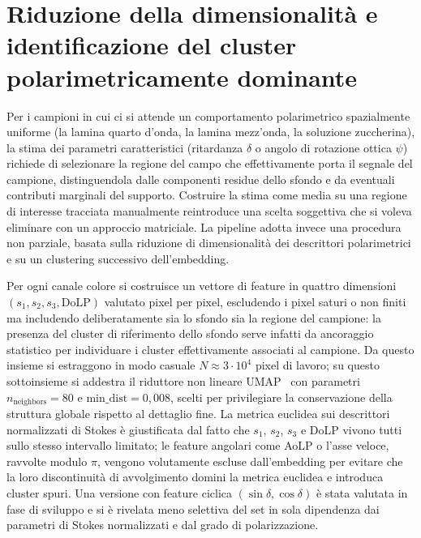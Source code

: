 
\section{Riduzione della dimensionalità e identificazione del cluster polarimetricamente dominante}
\label{sec:umap_clustering}

Per i campioni in cui ci si attende un comportamento polarimetrico spazialmente uniforme (la lamina quarto d'onda, la lamina mezz'onda, la soluzione zuccherina), la stima dei parametri caratteristici (ritardanza $\delta$ o angolo di rotazione ottica $\psi$) richiede di selezionare la regione del campo che effettivamente porta il segnale del campione, distinguendola dalle componenti residue dello sfondo e da eventuali contributi marginali del supporto. Costruire la stima come media su una regione di interesse tracciata manualmente reintroduce una scelta soggettiva che si voleva eliminare con un approccio matriciale. La pipeline adotta invece una procedura non parziale, basata sulla riduzione di dimensionalità dei descrittori polarimetrici e su un clustering successivo dell'embedding.

Per ogni canale colore si costruisce un vettore di feature in quattro dimensioni $(s_1, s_2, s_3, \mathrm{DoLP})$ valutato pixel per pixel, escludendo i pixel saturi o non finiti ma includendo deliberatamente sia lo sfondo sia la regione del campione: la presenza del cluster di riferimento dello sfondo serve infatti da ancoraggio statistico per individuare i cluster effettivamente associati al campione. Da questo insieme si estraggono in modo casuale $N \approx 3 \cdot 10^{4}$ pixel di lavoro; su questo sottoinsieme si addestra il riduttore non lineare UMAP~\cite{McInnes2018umap} con parametri $n_{\mathrm{neighbors}} = 80$ e $\mathrm{min\_dist} = 0{,}008$, scelti per privilegiare la conservazione della struttura globale rispetto al dettaglio fine. La metrica euclidea sui descrittori normalizzati di Stokes è giustificata dal fatto che $s_1$, $s_2$, $s_3$ e DoLP vivono tutti sullo stesso intervallo limitato; le feature angolari come AoLP o l'asse veloce, ravvolte modulo $\pi$, vengono volutamente escluse dall'embedding per evitare che la loro discontinuità di avvolgimento domini la metrica euclidea e introduca cluster spuri. Una versione con feature ciclica $(\sin\delta, \cos\delta)$ è stata valutata in fase di sviluppo e si è rivelata meno selettiva del set in sola dipendenza dai parametri di Stokes normalizzati e dal grado di polarizzazione.

